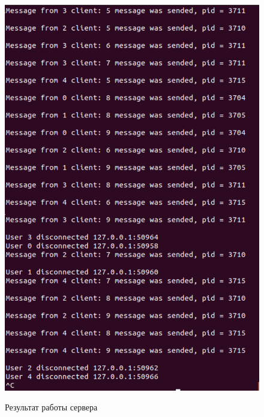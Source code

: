 \documentclass[a4paper,12pt]{article}
\begin{document}
	\begin{figure}[h!]
		\begin{center}
			{\includegraphics[scale = 0.7]{test_server_3_2.png}}
			\label{ris:test_server_3_2}
			\caption{Результат работы сервера}
		\end{center}
	\end{figure}

	\newpage
\end{document}
